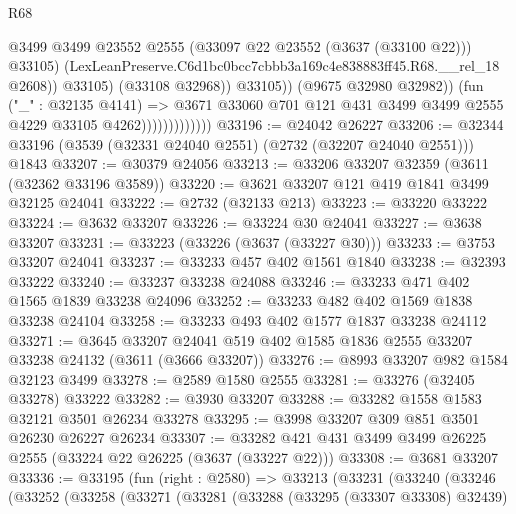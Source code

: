 \begin{lexlean}{R68}
\begin{coremodule}
                                          @3499
                                          @3499
                                          @23552
                                          @2555
                                          (@33097 @22 @23552 (@3637 (@33100 @22)))
                                          @33105)
                                        (LexLeanPreserve.C6d1bc0bcc7cbbb3a169c4e838883ff45.R68.__rel_18
                                          @2608))
                                      @33105)
                                    (@33108 @32968))
                                  @33105))
                              (@9675 @32980 @32982))
                            (fun ("_" : @32135 @4141) =>
                            @3671
                              @33060
                              @701
                              @121
                              @431
                              @3499
                              @3499
                              @2555
                              @4229
                              @33105
                              @4262)))))))))))))
@33196 := @24042 @26227
@33206 := @32344 @33196 (@3539 (@32331 @24040 @2551) (@2732 (@32207 @24040 @2551))) @1843
@33207 := @30379 @24056
@33213 := @33206 @33207 @32359 (@3611 (@32362 @33196 @3589))
@33220 := @3621 @33207 @121 @419 @1841 @3499 @32125 @24041
@33222 := @2732 (@32133 @213)
@33223 := @33220 @33222
@33224 := @3632 @33207
@33226 := @33224 @30 @24041
@33227 := @3638 @33207
@33231 := @33223 (@33226 (@3637 (@33227 @30)))
@33233 := @3753 @33207 @24041
@33237 := @33233 @457 @402 @1561 @1840
@33238 := @32393 @33222
@33240 := @33237 @33238 @24088
@33246 := @33233 @471 @402 @1565 @1839 @33238 @24096
@33252 := @33233 @482 @402 @1569 @1838 @33238 @24104
@33258 := @33233 @493 @402 @1577 @1837 @33238 @24112
@33271 := @3645
    @33207
    @24041
    @519
    @402
    @1585
    @1836
    @2555
    @33207
    @33238
    @24132
    (@3611 (@3666 @33207))
@33276 := @8993 @33207 @982 @1584 @32123 @3499
@33278 := @2589 @1580 @2555
@33281 := @33276 (@32405 @33278) @33222
@33282 := @3930 @33207
@33288 := @33282 @1558 @1583 @32121 @3501 @26234 @33278
@33295 := @3998 @33207 @309 @851 @3501 @26230 @26227 @26234
@33307 := @33282 @421 @431 @3499 @3499 @26225 @2555 (@33224 @22 @26225 (@3637 (@33227 @22)))
@33308 := @3681 @33207
@33336 := @33195
    (fun (right : @2580) =>
    @33213
      (@33231
        (@33240
          (@33246
            (@33252
              (@33258
                (@33271
                  (@33281
                    (@33288
                      (@33295 (@33307 @33308) @32439)

\end{coremodule}
\end{lexlean}
